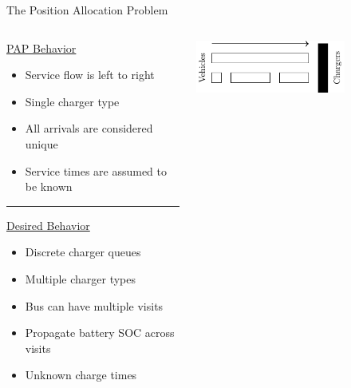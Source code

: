 \documentclass[aspectratio=169,dvipsnames]{beamer}
\begin{document}
\begin{frame}[label={sec:orgb42ce6c}]{The Position Allocation Problem}
\begin{columns}
\begin{column}{0.5\columnwidth}
\begin{center} {\small \underline{PAP Behavior}}\end{center}

{\small
\begin{itemize}
\item Service flow is left to right
\item Single charger type
\item All arrivals are considered unique
\item Service times are assumed to be known
\end{itemize}
}

\noindent\rule{\textwidth}{0.5pt}

\begin{center} {\small \underline{Desired Behavior}}\end{center}

{\small
\begin{itemize}
\item Discrete charger queues
\item Multiple charger types
\item Bus can have multiple visits
\item Propagate battery SOC across visits
\item Unknown charge times
\end{itemize}
}
\end{column}

\begin{column}{0.5\columnwidth}
\begin{center}
\includegraphics[width=0.7\textwidth]{./img/pap.pdf}
\end{center}

\begin{figure}
  \centering
\end{figure}
\end{column}
\end{columns}
\end{frame}
\end{document}
